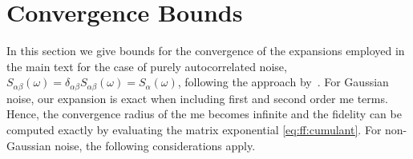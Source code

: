 \section{Convergence Bounds}\label{sec:app:ff:convergence}
In this section we give bounds for the convergence of the expansions employed in the main text for the case of purely autocorrelated noise, $S_{\alpha\beta}(\omega) = \delta_{\alpha\beta}S_{\alpha\beta}(\omega) =  S_\alpha(\omega)$, following the approach by~\citet{Green2013}.
For Gaussian noise, our expansion is exact when including first and second order \acrfull{me} terms.
Hence, the convergence radius of the \gls{me} becomes infinite and the fidelity can be computed exactly by evaluating the matrix exponential \cref{eq:ff:cumulant}.
For non-Gaussian noise, the following considerations apply.
